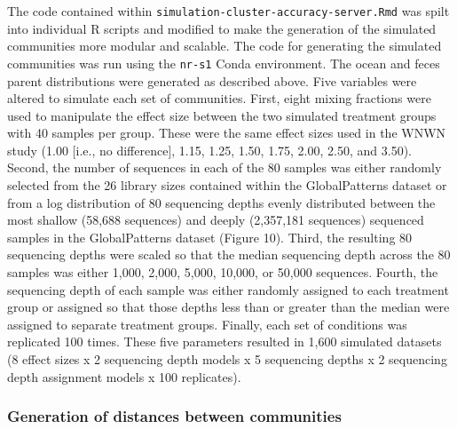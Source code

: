 \documentclass[
]{article}
\begin{document}
The code contained within
\texttt{simulation-cluster-accuracy-server.Rmd} was spilt into
individual R scripts and modified to make the generation of the
simulated communities more modular and scalable. The code for generating
the simulated communities was run using the \texttt{nr-s1} Conda
environment. The ocean and feces parent distributions were generated as
described above. Five variables were altered to simulate each set of
communities. First, eight mixing fractions were used to manipulate the
effect size between the two simulated treatment groups with 40 samples
per group. These were the same effect sizes used in the WNWN study (1.00
{[}i.e., no difference{]}, 1.15, 1.25, 1.50, 1.75, 2.00, 2.50, and
3.50). Second, the number of sequences in each of the 80 samples was
either randomly selected from the 26 library sizes contained within the
GlobalPatterns dataset or from a log distribution of 80 sequencing
depths evenly distributed between the most shallow (58,688 sequences)
and deeply (2,357,181 sequences) sequenced samples in the GlobalPatterns
dataset (Figure 10). Third, the resulting 80 sequencing depths were
scaled so that the median sequencing depth across the 80 samples was
either 1,000, 2,000, 5,000, 10,000, or 50,000 sequences. Fourth, the
sequencing depth of each sample was either randomly assigned to each
treatment group or assigned so that those depths less than or greater
than the median were assigned to separate treatment groups. Finally,
each set of conditions was replicated 100 times. These five parameters
resulted in 1,600 simulated datasets (8 effect sizes x 2 sequencing
depth models x 5 sequencing depths x 2 sequencing depth assignment
models x 100 replicates).

\hypertarget{generation-of-distances-between-communities}{%
\subsubsection{Generation of distances between
communities}\label{generation-of-distances-between-communities}}
\end{document}
